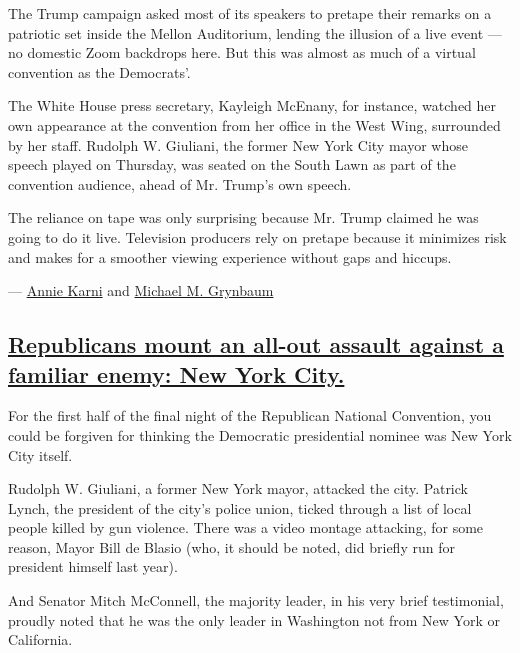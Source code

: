 The Trump campaign asked most of its speakers to pretape their remarks
on a patriotic set inside the Mellon Auditorium, lending the illusion of
a live event --- no domestic Zoom backdrops here. But this was almost as
much of a virtual convention as the Democrats'.

The White House press secretary, Kayleigh McEnany, for instance, watched
her own appearance at the convention from her office in the West Wing,
surrounded by her staff. Rudolph W. Giuliani, the former New York City
mayor whose speech played on Thursday, was seated on the South Lawn as
part of the convention audience, ahead of Mr. Trump's own speech.

The reliance on tape was only surprising because Mr. Trump claimed he
was going to do it live. Television producers rely on pretape because it
minimizes risk and makes for a smoother viewing experience without gaps
and hiccups.

--- \href{https://www.nytimes3xbfgragh.onion/by/annie-karni}{Annie
Karni} and
\href{https://www.nytimes3xbfgragh.onion/by/michael-m-grynbaum}{Michael
M. Grynbaum}

\hypertarget{republicans-mount-an-all-out-assault-against-a-familiar-enemy-new-york-city}{%
\subsection{\texorpdfstring{\protect\hyperlink{republicans-mount-an-all-out-assault-against-a-familiar-enemy-new-york-city}{Republicans
mount an all-out assault against a familiar enemy: New York
City.}}{Republicans mount an all-out assault against a familiar enemy: New York City.}}\label{republicans-mount-an-all-out-assault-against-a-familiar-enemy-new-york-city}}

For the first half of the final night of the Republican National
Convention, you could be forgiven for thinking the Democratic
presidential nominee was New York City itself.

Rudolph W. Giuliani, a former New York mayor, attacked the city. Patrick
Lynch, the president of the city's police union, ticked through a list
of local people killed by gun violence. There was a video montage
attacking, for some reason, Mayor Bill de Blasio (who, it should be
noted, did briefly run for president himself last year).

And Senator Mitch McConnell, the majority leader, in his very brief
testimonial, proudly noted that he was the only leader in Washington not
from New York or California.

